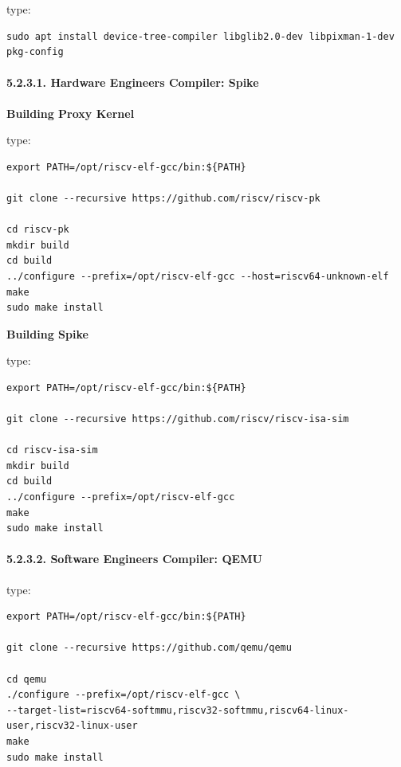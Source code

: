 \documentclass[
]{article}
\begin{document}
type:

\begin{verbatim}
sudo apt install device-tree-compiler libglib2.0-dev libpixman-1-dev pkg-config
\end{verbatim}

\hypertarget{hardware-engineers-compiler-spike-1}{%
\paragraph{5.2.3.1. Hardware Engineers Compiler:
Spike}\label{hardware-engineers-compiler-spike-1}}

\textbf{Building Proxy Kernel}

type:

\begin{verbatim}
export PATH=/opt/riscv-elf-gcc/bin:${PATH}

git clone --recursive https://github.com/riscv/riscv-pk

cd riscv-pk
mkdir build
cd build
../configure --prefix=/opt/riscv-elf-gcc --host=riscv64-unknown-elf
make
sudo make install
\end{verbatim}

\textbf{Building Spike}

type:

\begin{verbatim}
export PATH=/opt/riscv-elf-gcc/bin:${PATH}

git clone --recursive https://github.com/riscv/riscv-isa-sim

cd riscv-isa-sim
mkdir build
cd build
../configure --prefix=/opt/riscv-elf-gcc
make
sudo make install
\end{verbatim}

\hypertarget{software-engineers-compiler-qemu-1}{%
\paragraph{5.2.3.2. Software Engineers Compiler:
QEMU}\label{software-engineers-compiler-qemu-1}}

type:

\begin{verbatim}
export PATH=/opt/riscv-elf-gcc/bin:${PATH}

git clone --recursive https://github.com/qemu/qemu

cd qemu
./configure --prefix=/opt/riscv-elf-gcc \
--target-list=riscv64-softmmu,riscv32-softmmu,riscv64-linux-user,riscv32-linux-user
make
sudo make install
\end{verbatim}
\end{document}
